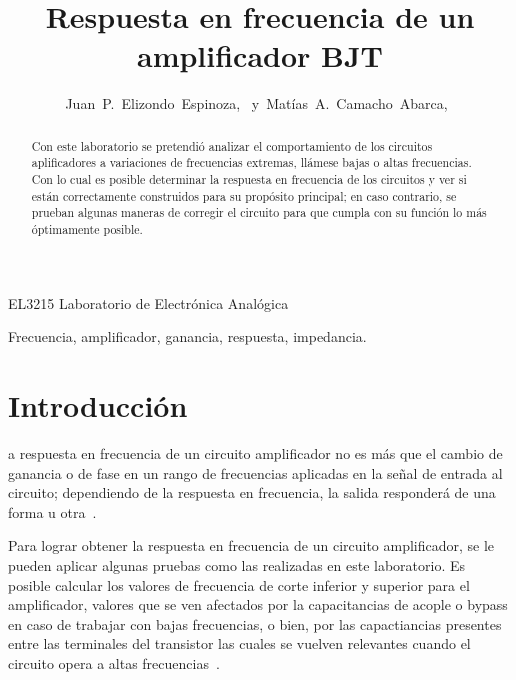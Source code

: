 \documentclass[journal]{IEEEtran}
\begin{document}
\title{Respuesta en frecuencia de un amplificador BJT}


\author{Juan~P.~Elizondo~Espinoza,~
        y~Matías~A.~Camacho~Abarca,~
}


%
{EL3215 Laboratorio de Electrónica Analógica}


\maketitle


\begin{abstract}
    Con este laboratorio se pretendió analizar el comportamiento de los circuitos aplificadores a variaciones de frecuencias extremas, llámese bajas o altas frecuencias. 
    Con lo cual es posible determinar la respuesta en frecuencia de los circuitos y ver si están correctamente construidos para su propósito principal; en caso contrario,
    se prueban algunas maneras de corregir el circuito para que cumpla con su función lo más óptimamente posible.
\end{abstract}

\begin{IEEEkeywords}
Frecuencia, amplificador, ganancia, respuesta, impedancia.
\end{IEEEkeywords}


\section{Introducción}

a respuesta en frecuencia de un circuito amplificador no es más que el cambio de ganancia o de fase
en un rango de frecuencias aplicadas en la señal de entrada al circuito; dependiendo de la respuesta en frecuencia, 
la salida responderá de una forma u otra~\cite{Floyd}.

Para lograr obtener la respuesta en frecuencia de un circuito amplificador, se le pueden aplicar algunas pruebas
como las realizadas en este laboratorio. Es posible calcular los valores de frecuencia de corte inferior y superior 
para el amplificador, valores que se ven afectados por la capacitancias de acople o bypass en caso de trabajar con bajas
frecuencias, o bien, por las capactiancias presentes entre las terminales del transistor las cuales se vuelven relevantes 
cuando el circuito opera a altas frecuencias~\cite{Floyd}.
\end{document}
